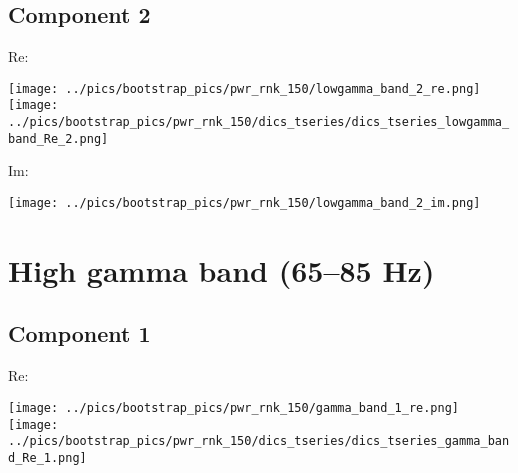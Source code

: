 \documentclass{article}
\begin{document}
\subsection*{Component 2}
Re:

\hspace{2cm}
\texttt{[image: ../pics/bootstrap\_pics/pwr\_rnk\_150/lowgamma\_band\_2\_re.png]}
\hspace{2cm}
\texttt{[image: ../pics/bootstrap\_pics/pwr\_rnk\_150/dics\_tseries/dics\_tseries\_lowgamma\_band\_Re\_2.png]}

Im:

\hspace{2cm}
\texttt{[image: ../pics/bootstrap\_pics/pwr\_rnk\_150/lowgamma\_band\_2\_im.png]}



\section{High gamma band (65--85 Hz)}
\subsection*{Component 1}
Re:

\hspace{2cm}
\texttt{[image: ../pics/bootstrap\_pics/pwr\_rnk\_150/gamma\_band\_1\_re.png]}
\hspace{2cm}
\texttt{[image: ../pics/bootstrap\_pics/pwr\_rnk\_150/dics\_tseries/dics\_tseries\_gamma\_band\_Re\_1.png]}
\end{document}

